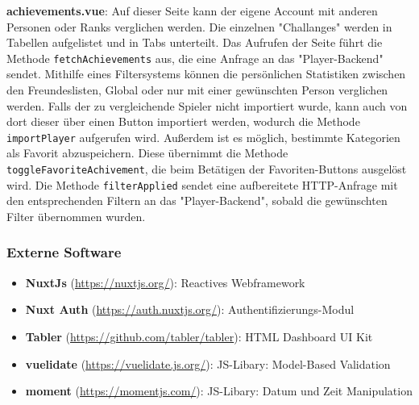 \textbf{achievements.vue}: Auf dieser Seite kann der eigene Account mit anderen Personen oder Ranks verglichen werden. Die einzelnen "Challanges" werden in Tabellen aufgelistet und in Tabs unterteilt.
Das Aufrufen der Seite führt die Methode \verb|fetchAchievements| aus, die eine Anfrage an das "Player-Backend" sendet. Mithilfe eines Filtersystems können die persönlichen
Statistiken zwischen den Freundeslisten, Global oder nur mit einer gewünschten Person verglichen werden. Falls der zu vergleichende Spieler nicht importiert wurde, kann auch von dort dieser über einen 
Button importiert werden, wodurch die Methode \verb|importPlayer| aufgerufen wird. Außerdem ist es möglich, bestimmte Kategorien als Favorit abzuspeichern. Diese übernimmt die Methode
\verb|toggleFavoriteAchivement|, die beim Betätigen der Favoriten-Buttons ausgelöst wird. Die Methode \verb|filterApplied| sendet eine aufbereitete HTTP-Anfrage mit den entsprechenden Filtern
an das "Player-Backend", sobald die gewünschten Filter übernommen wurden.
\newline

\subsubsection{Externe Software}
\begin{itemize}
    \item \textbf{NuxtJs} (\href{https://nuxtjs.org/}{https://nuxtjs.org/}): Reactives Webframework
    \item \textbf{Nuxt Auth} (\href{https://auth.nuxtjs.org/}{https://auth.nuxtjs.org/}): Authentifizierungs-Modul
    \item \textbf{Tabler} (\href{https://github.com/tabler/tabler}{https://github.com/tabler/tabler}): HTML Dashboard UI Kit
    \item \textbf{vuelidate} (\href{https://vuelidate.js.org/}{https://vuelidate.js.org/}): JS-Libary: Model-Based Validation
    \item \textbf{moment} (\href{https://momentjs.com/}{https://momentjs.com/}): JS-Libary: Datum und Zeit Manipulation
\end{itemize}